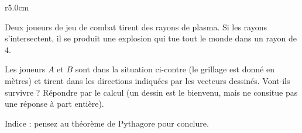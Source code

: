 
\begin{exercice}\label{exosmath-0411}

\begin{wrapfigure}{r}{5.0cm}
            \vspace{-0.5cm}        %
                \centering
                    
                \end{wrapfigure}

    Deux joueurs de jeu de combat tirent des rayons de plasma. Si les rayons s'intersectent, il se produit une explosion qui tue tout le monde dans un rayon de \unit{4}{\meter}. 

    Les joueurs \( A\) et \( B\) sont dans la situation ci-contre (le grillage est donné en mètres) et tirent dans les directions indiquées par les vecteurs dessinés. Vont-ils survivre ? Répondre par le calcul (un dessin est le bienvenu, mais ne consitue pas une réponse à part entière). 

    Indice : pensez au théorème de Pythagore pour conclure.

\end{exercice}
